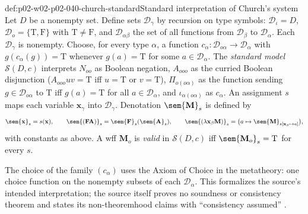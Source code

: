 \begin{hbdefinition}{def:p02-w02-p02-040-church-standard}{Standard interpretation of Church's system}
Let \(D\) be a nonempty set.  Define sets \(\mathcal D_\gamma\) by recursion
on type symbols: \(\mathcal D_\iota=D\), \(\mathcal D_o=\{\mathrm T,\mathrm F\}\)
with \(\mathrm T\ne\mathrm F\), and \(\mathcal D_{\alpha\beta}\) the set of all
functions from \(\mathcal D_\beta\) to \(\mathcal D_\alpha\).  Each
\(\mathcal D_\gamma\) is nonempty.  Choose, for every type \(\alpha\), a
function \(c_\alpha:\mathcal D_{o\alpha}\to\mathcal D_\alpha\) with
\(g(c_\alpha(g))=\mathrm T\) whenever \(g(a)=\mathrm T\) for some
\(a\in\mathcal D_\alpha\).  The \emph{standard model} \(\mathcal S(D,c)\)
interprets \(N_{oo}\) as Boolean negation, \(A_{ooo}\) as the curried Boolean
disjunction (\(A_{ooo}uv=\mathrm T\) iff \(u=\mathrm T\) or \(v=\mathrm T\)),
\(\Pi_{o(o\alpha)}\) as the function sending \(g\in\mathcal D_{o\alpha}\) to
\(\mathrm T\) iff \(g(a)=\mathrm T\) for all \(a\in\mathcal D_\alpha\), and
\(\iota_{\alpha(o\alpha)}\) as \(c_\alpha\).  An assignment \(s\) maps each
variable \(\mathbf x_\gamma\) into \(\mathcal D_\gamma\).  Denotation
\(\sem{\mathbf M}_s\) is defined by
\[
 \sem{\mathbf x}_s=s(\mathbf x),\qquad
 \sem{(\mathbf F\mathbf A)}_s=\sem{\mathbf F}_s(\sem{\mathbf A}_s),\qquad
 \sem{(\lambda\mathbf x_\beta\mathbf M)}_s=
 \bigl(a\mapsto\sem{\mathbf M}_{s[\mathbf x_\beta\mapsto a]}\bigr),
\]
with constants as above.  A wff \(\mathbf M_o\) is \emph{valid} in
\(\mathcal S(D,c)\) iff \(\sem{\mathbf M_o}_s=\mathrm T\) for every \(s\).
\end{hbdefinition}

The choice of the family \((c_\alpha)\) uses the Axiom of Choice in the
metatheory: one choice function on the nonempty subsets of each
\(\mathcal D_\alpha\).  This formalizes the source's intended
interpretation; the source itself proves no soundness or consistency
theorem and states its non-theoremhood claims with ``consistency assumed''
\cite[\S6, p.~64]{Church1940}.

